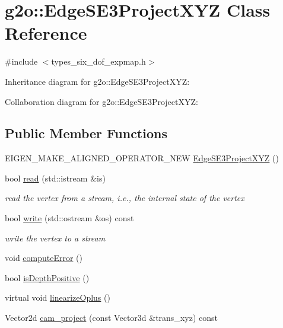 \hypertarget{classg2o_1_1EdgeSE3ProjectXYZ}{}\section{g2o\+:\+:Edge\+S\+E3\+Project\+X\+YZ Class Reference}
\label{classg2o_1_1EdgeSE3ProjectXYZ}


{\ttfamily \#include $<$types\+\_\+six\+\_\+dof\+\_\+expmap.\+h$>$}



Inheritance diagram for g2o\+:\+:Edge\+S\+E3\+Project\+X\+YZ\+:


Collaboration diagram for g2o\+:\+:Edge\+S\+E3\+Project\+X\+YZ\+:
\subsection*{Public Member Functions}
\begin{DoxyCompactItemize}
\item 
E\+I\+G\+E\+N\+\_\+\+M\+A\+K\+E\+\_\+\+A\+L\+I\+G\+N\+E\+D\+\_\+\+O\+P\+E\+R\+A\+T\+O\+R\+\_\+\+N\+EW \hyperlink{classg2o_1_1EdgeSE3ProjectXYZ_acdf6cb451767e46e7bbd6a180782feb8}{Edge\+S\+E3\+Project\+X\+YZ} ()
\item 
bool \hyperlink{classg2o_1_1EdgeSE3ProjectXYZ_a04200f3d6b7fbd47961df696f1ee34ed}{read} (std\+::istream \&is)
\begin{DoxyCompactList}\small\item\em read the vertex from a stream, i.\+e., the internal state of the vertex \end{DoxyCompactList}\item 
bool \hyperlink{classg2o_1_1EdgeSE3ProjectXYZ_a3f09d0456f011dfa53b6f61b566e27fd}{write} (std\+::ostream \&os) const 
\begin{DoxyCompactList}\small\item\em write the vertex to a stream \end{DoxyCompactList}\item 
void \hyperlink{classg2o_1_1EdgeSE3ProjectXYZ_a79a763e1d42fe9eb5732abe59c7723d9}{compute\+Error} ()
\item 
bool \hyperlink{classg2o_1_1EdgeSE3ProjectXYZ_a603cc0018b5b05fd193e84e032a66d07}{is\+Depth\+Positive} ()
\item 
virtual void \hyperlink{classg2o_1_1EdgeSE3ProjectXYZ_a7454e89740635d782c9e4efaef35ec44}{linearize\+Oplus} ()
\item 
Vector2d \hyperlink{classg2o_1_1EdgeSE3ProjectXYZ_aa44a34f1d1a75d7263b7527d75f8a9dc}{cam\+\_\+project} (const Vector3d \&trans\+\_\+xyz) const 
\end{DoxyCompactItemize}
